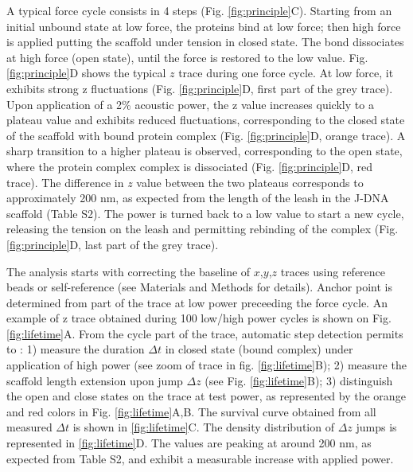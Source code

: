 \documentclass{biophys-new}
\begin{document}
A typical force cycle consists in 4 steps (Fig. \ref{fig:principle}C). Starting from an initial unbound state at low force, the proteins bind at low force; then high force is applied putting the scaffold under tension in closed state. The bond dissociates at high force (open state), until the force is restored to the low value. Fig. \ref{fig:principle}D shows the typical $z$ trace during one force cycle. At low force, it exhibits strong z fluctuations (Fig. \ref{fig:principle}D, first part of the grey trace). Upon application of a 2\% acoustic power, the z value increases quickly to a plateau value and exhibits reduced fluctuations, corresponding to the closed state of the scaffold with bound protein complex (Fig. \ref{fig:principle}D, orange trace). A sharp transition to a higher plateau is observed, corresponding to the open state, where the protein complex complex is dissociated (Fig. \ref{fig:principle}D, red trace). The difference in $z$ value between the two plateaus corresponds to approximately 200 nm, as expected from the length of the leash in the J-DNA scaffold (Table S2). The power is turned back to a low value to start a new cycle, releasing the tension on the leash and permitting rebinding of the complex (Fig. \ref{fig:principle}D, last part of the grey trace).

The analysis starts with correcting the baseline of $x$,$y$,$z$ traces using reference beads or self-reference (see Materials and Methods for details). Anchor point is determined from part of the trace at low power preceeding the force cycle. An example of z trace obtained during 100 low/high power cycles is shown on Fig. \ref{fig:lifetime}A. From the cycle part of the trace, automatic step detection permits to : 1) measure the duration $\Delta t$ in closed state (bound complex) under application of high power (see zoom of trace in fig. \ref{fig:lifetime}B); 2) measure the scaffold length extension upon jump $\Delta z$ (see Fig. \ref{fig:lifetime}B); 3) distinguish the open and close states on the trace at test power, as represented by the orange and red colors in Fig. \ref{fig:lifetime}A,B. The survival curve obtained from all measured $\Delta t$ is shown in \ref{fig:lifetime}C. The density distribution of $\Delta z$ jumps is represented in \ref{fig:lifetime}D. The values are peaking at around 200 nm, as expected from Table S2, and exhibit a measurable increase with applied power.
\end{document}
